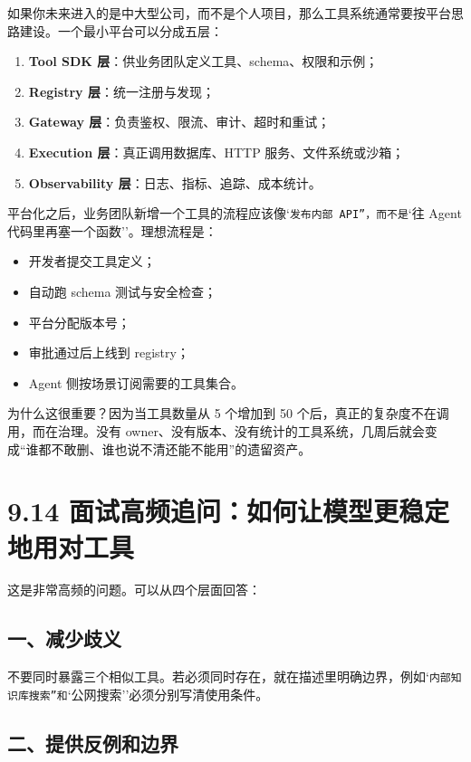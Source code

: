 如果你未来进入的是中大型公司，而不是个人项目，那么工具系统通常要按平台思路建设。一个最小平台可以分成五层：


\begin{enumerate}[leftmargin=2em]
\item \textbf{Tool SDK 层}：供业务团队定义工具、schema、权限和示例；
\item \textbf{Registry 层}：统一注册与发现；
\item \textbf{Gateway 层}：负责鉴权、限流、审计、超时和重试；
\item \textbf{Execution 层}：真正调用数据库、HTTP 服务、文件系统或沙箱；
\item \textbf{Observability 层}：日志、指标、追踪、成本统计。
\end{enumerate}

平台化之后，业务团队新增一个工具的流程应该像`\texttt{发布内部 API''，而不是}`往 Agent 代码里再塞一个函数''。理想流程是：


\begin{itemize}[leftmargin=2em]
\item 开发者提交工具定义；
\item 自动跑 schema 测试与安全检查；
\item 平台分配版本号；
\item 审批通过后上线到 registry；
\item Agent 侧按场景订阅需要的工具集合。
\end{itemize}

为什么这很重要？因为当工具数量从 5 个增加到 50 个后，真正的复杂度不在调用，而在治理。没有 owner、没有版本、没有统计的工具系统，几周后就会变成``谁都不敢删、谁也说不清还能不能用''的遗留资产。


\section{9.14 面试高频追问：如何让模型更稳定地用对工具}

这是非常高频的问题。可以从四个层面回答：


\subsection{一、减少歧义}

不要同时暴露三个相似工具。若必须同时存在，就在描述里明确边界，例如`\texttt{内部知识库搜索''和}`公网搜索''必须分别写清使用条件。


\subsection{二、提供反例和边界}

